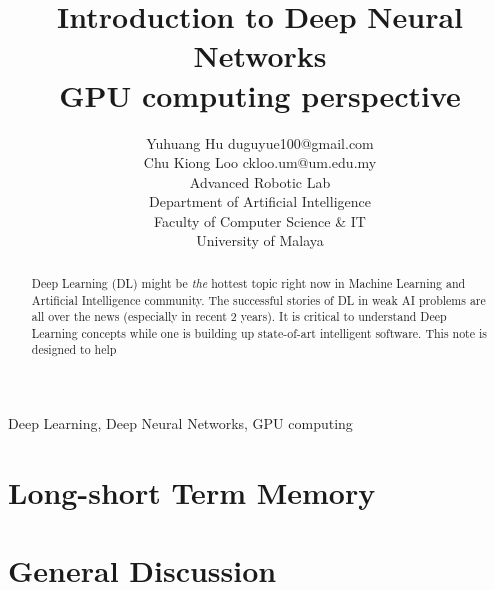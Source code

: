 \documentclass[twoside,11pt]{article}
\begin{document}
\title{Introduction to Deep Neural Networks \\
\normalsize GPU computing perspective}

\author{\name Yuhuang Hu \email duguyue100@gmail.com \\
       \name Chu Kiong Loo \email ckloo.um@um.edu.my \\
       \addr Advanced Robotic Lab\\
       Department of Artificial Intelligence\\
       Faculty of Computer Science \& IT \\
       University of Malaya}
       

\maketitle

\begin{abstract}%
Deep Learning (DL) might be \emph{the} hottest topic right now in Machine Learning and Artificial Intelligence community. The successful stories of DL in weak AI problems are all over the news (especially in recent 2 years). It is critical to understand Deep Learning concepts while one is building up state-of-art intelligent software. This note is designed to help 
\end{abstract}

\begin{keywords}
  Deep Learning, Deep Neural Networks, GPU computing
\end{keywords}

\newpage


\newpage


\newpage


\newpage


\newpage


\newpage
\section{Long-short Term Memory}

\newpage
\section{General Discussion}

\newpage




\newpage


\vskip 0.2in

\end{document}
